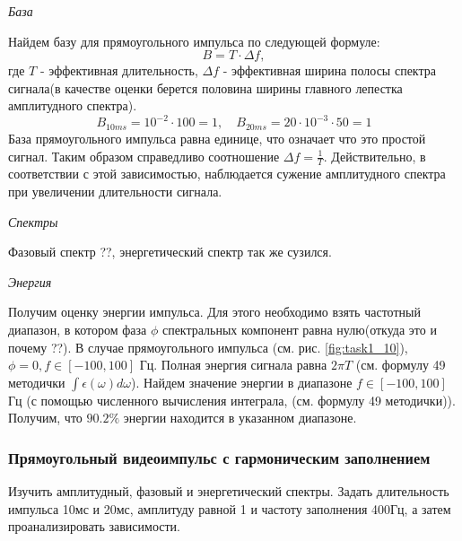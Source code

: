 \textit{База}

Найдем базу для прямоугольного импульса по следующей формуле: 
\begin{equation}
    B = T \cdot \Delta f,
    \label{eq:p:1}
\end{equation}
где $T$ - эффективная длительность, $\Delta f$ - эффективная ширина полосы спектра
сигнала(в качестве оценки берется половина ширины главного лепестка амплитудного спектра).
\begin{equation}
    B_{10ms} = 10^{-2} \cdot 100 = 1, \quad B_{20ms} = 20 \cdot 10^{-3} \cdot 50 = 1
    \label{eq:}
\end{equation}
База прямоугольного импульса равна единице, что означает что это простой сигнал. Таким образом
справедливо соотношение $\Delta f = \frac{1}{T}$. Действительно, в соответствии с этой зависимостью,
наблюдается сужение амплитудного спектра при увеличении длительности сигнала.

\textit{Спектры}

Фазовый спектр ??, энергетический спектр так же сузился.

\textit{Энергия}

Получим оценку энергии импульса. Для этого необходимо взять частотный диапазон, в котором фаза $\phi$ спектральных компонент
равна нулю(откуда это и почему ??). В случае прямоугольного импульса (см. рис. \ref{fig:task1_10}), $\phi=0, f \in [-100,
100]$ Гц. 
Полная энергия сигнала равна $2 \pi T$ (см. формулу 49 методички $\int \epsilon(\omega) d\omega$). Найдем значение
энергии в диапазоне $f \in [-100, 100]$ Гц (с помощью численного вычисления интеграла, (см. формулу 49 методички)).
Получим, что $90.2 \%$ энергии находится в указанном диапазоне.


\subsubsection{Прямоугольный видеоимпульс с гармоническим заполнением}
Изучить амплитудный, фазовый и энергетический спектры. Задать
длительность импульса 10мс и 20мс, амплитуду равной 1 и частоту
заполнения 400Гц, а затем проанализировать зависимости.

